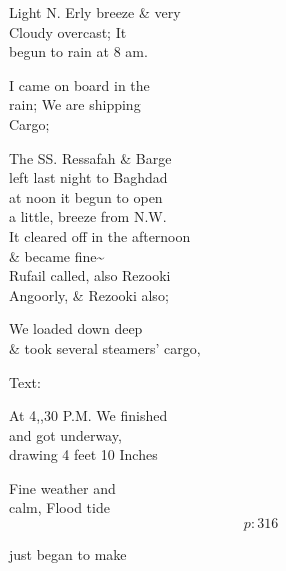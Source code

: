 \documentclass{report}
\begin{document}

	\par{
 	Light N. Erly breeze \& very\ \\Cloudy overcast; It\ \\begun to rain at 8 am.\ \\
	}

	\par{
 	I came on board in the\ \\rain; We are shipping\ \\Cargo;\ \\
	}

	\par{
 	The SS. Ressafah \& Barge\ \\left last night to Baghdad\ \\at noon it begun to open\ \\a little, breeze from N.W.\ \\It cleared off in the afternoon\ \\\& became fine\~{}\ \\Rufail called, also Rezooki\ \\Angoorly, \& Rezooki also;\ \\
	}

	\par{
 	We loaded down deep\ \\\& took several steamers’ cargo,\ \\
	}

	\par{
 	Text:\ \\
	}

	\par{
 	At 4,,30 P.M. We finished\ \\and got underway,\ \\drawing 4 feet 10 Inches\ \\
	}

	\par{
 	Fine weather and\ \\calm, Flood tide\ \\
  \[p: 316 \]

	}






	\par{
 	just began to make\ \\
	}
\end{document}
